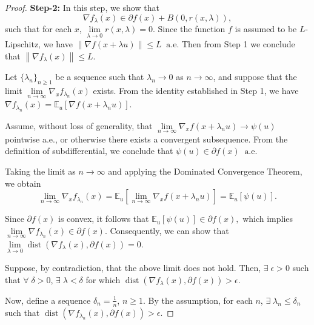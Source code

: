 \documentclass[9pt,journal,twoside,web]{ieeecolor}
\newcommand{\norm}[1]{\left\lVert #1 \right\rVert}
\DeclareMathOperator*{\dist}{dist}
\begin{document}
\begin{proof}
\textbf{Step-2:} In this step, we show that
\begin{equation*}
    \nabla f_\lambda (x) \in \partial f(x) + B(0,r(x,\lambda)),
\end{equation*} 
such that for each $x$, $\lim\limits_{\lambda \to 0} r(x,\lambda) = 0$.
Since the function $f$ is assumed to be $L$-Lipschitz, we have $ \norm{\nabla f(x+\lambda u)} \leq L \; \; \text{a.e.} $ 
Then from Step 1 we conclude that $\norm{\nabla f_\lambda (x)} \leq L$. 

Let $\{\lambda_n\}_{n \geq 1}$
  be a sequence such that  $\lambda_n \to 0$ as 
$n \to \infty$, and suppose that the limit $\lim\limits_{n \to \infty} \nabla_x f_{\lambda_n}(x) $ exists. From the identity established in Step 1, we have $ \nabla f_{\lambda_n} (x) = \mathbb{E}_u [\nabla f(x+\lambda_n u)].$

  Assume, without loss of generality, that $\lim\limits_{n \to \infty} \nabla_x f(x+\lambda_n u)  \to \psi (u)$ pointwise a.e., or otherwise there exists a convergent subsequence. From the definition of subdifferential, we conclude that $ \psi (u) \in \partial f(x)  \; \; \text{a.e.}$


Taking the limit as  $n \to \infty$  and applying the Dominated Convergence Theorem, we obtain
\begin{equation*}
  \lim\limits_{n \to \infty}  \nabla_x f_{\lambda_n} (x) = \mathbb{E}_u [ \lim\limits_{n \to \infty} \nabla_x f(x+\lambda_n u)] = \mathbb{E}_u[\psi(u)].
\end{equation*}

Since $\partial f(x)$ is convex, it follows that $\mathbb{E}_u[\psi(u)] \in \partial f(x),$ 
which implies $\lim\limits_{n \to \infty} \nabla f_{\lambda_n} (x) \in \partial f(x).$ 
Consequently, we can show that $\lim\limits_{\lambda \to 0} \dist (\nabla f_\lambda (x), \partial f(x))
    =    0$.

Suppose, by contradiction, that the above limit does not hold. Then, $\exists \; \epsilon >0$ such that $\forall \; \delta > 0$, $\exists \; \lambda < \delta$ for which $ \dist (\nabla f_\lambda (x), \partial f(x)) > \epsilon.$

Now, define a sequence $\delta_n = \frac{1}{n}$, $n\geq 1$. By the assumption, for each $n$,  $\exists \; \lambda_n \leq \delta_n $ such that  $ \dist (\nabla f_{\lambda_n} (x), \partial f(x)) > \epsilon. $


\end{proof}
\end{document}
